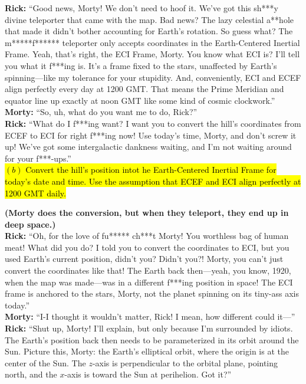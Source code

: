\documentclass[a4paper, 12pt]{exam}
\begin{document}
\noindent \textbf{Rick:} “Good news, Morty! We don’t need to hoof it. We’ve got this sh***y divine teleporter that came with the map. Bad news? The lazy celestial a**hole that made it didn’t bother accounting for Earth’s rotation. So guess what? The m*****f****** teleporter only accepts coordinates in the Earth-Centered Inertial Frame. Yeah, that’s right, the ECI Frame, Morty. You know what ECI is? I’ll tell you what it f***ing is. It’s a frame fixed to the stars, unaffected by Earth’s spinning—like my tolerance for your stupidity. And, conveniently, ECI and ECEF align perfectly every day at 1200 GMT. That means the Prime Meridian and equator line up exactly at noon GMT like some kind of cosmic clockwork.”\\

\noindent \textbf{Morty:} “So, uh, what do you want me to do, Rick?”\\

\noindent \textbf{Rick:} “What do I f***ing want? I want you to convert the hill’s coordinates from ECEF to ECI for right f***ing now! Use today’s time, Morty, and don’t screw it up! We’ve got some intergalactic dankness waiting, and I’m not waiting around for your f***-ups.” \\

\hl{$(b)$ Convert the hill's position intot he Earth-Centered Inertial Frame for today's date and time. Use the assumption that ECEF and ECI align perfectly at 1200 GMT daily.}

\bigskip
\noindent \textbf{(Morty does the conversion, but when they teleport, they end up in deep space.)} \\

\noindent \textbf{Rick:} “Oh, for the love of fu***** ch***t Morty! You worthless bag of human meat! What did you do? I told you to convert the coordinates to ECI, but you used Earth’s current position, didn’t you? Didn’t you?! Morty, you can’t just convert the coordinates like that! The Earth back then—yeah, you know, 1920, when the map was made—was in a different f***ing position in space! The ECI frame is anchored to the stars, Morty, not the planet spinning on its tiny-ass axis today.”\\

\noindent \textbf{Morty:} “I-I thought it wouldn’t matter, Rick! I mean, how different could it—”\\

\noindent \textbf{Rick:} “Shut up, Morty! I’ll explain, but only because I’m surrounded by idiots. The Earth’s position back then needs to be parameterized in its orbit around the Sun. Picture this, Morty: the Earth’s elliptical orbit, where the origin is at the center of the Sun. The \( z \)-axis is perpendicular to the orbital plane, pointing north, and the \( x \)-axis is toward the Sun at perihelion. Got it?”\\
\end{document}
